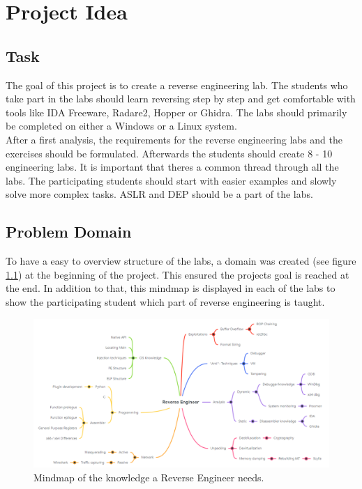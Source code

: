 \chapter{Project Idea}
\section{Task}
\label{sec:task}
The goal of this project is to create a reverse engineering lab. The students who take part in the labs should learn reversing step by step and get comfortable with tools like IDA Freeware, Radare2, Hopper or Ghidra. The labs should primarily be completed on either a Windows or a Linux system. \\
After a first analysis, the requirements for the reverse engineering labs and the exercises should be formulated. Afterwards the students should create 8 - 10 engineering labs. It is important that theres a common thread through all the labs. The participating students should start with easier examples and slowly solve more complex tasks. ASLR and DEP should be a part of the labs.

\section{Problem Domain}
To have a easy to overview structure of the labs, a domain was created (see figure \ref{fig:mindmap}) at the beginning of the project. This ensured the projects goal is reached at the end. In addition to that, this mindmap is displayed in each of the labs to show the participating student which part of reverse engineering is taught.
\begin{figure}[H]
    \includegraphics[width=\linewidth, center]{resources/RE_Domain_Light.png}
    \caption{Mindmap of the knowledge a Reverse Engineer needs.}
    \label{fig:mindmap}
\end{figure}

